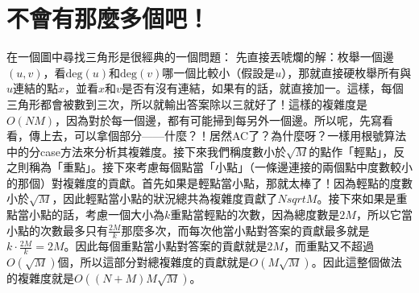 \section{不會有那麼多個吧！}
	在一個圖中尋找三角形是很經典的一個問題：
	先直接丟唬爛的解：枚舉一個邊$(u, v)$，看$\text{deg}(u)$和$\text{deg}(v)$哪一個比較小（假設是$u$），那就直接硬枚舉所有與$u$連結的點$x$，並看$x$和$v$是否有沒有連結，如果有的話，就直接加一。這樣，每個三角形都會被數到三次，所以就輸出答案除以三就好了！這樣的複雜度是$O(NM)$，因為對於每一個邊，都有可能掃到每另外一個邊。所以呢，先寫看看，傳上去，可以拿個部分——什麼？！居然AC了？為什麼呀？一樣用根號算法中的分case方法來分析其複雜度。接下來我們稱度數小於$\sqrt{M}$的點作「輕點」，反之則稱為「重點」。接下來考慮每個點當「小點」（一條邊連接的兩個點中度數較小的那個）對複雜度的貢獻。首先如果是輕點當小點，那就太棒了！因為輕點的度數小於$\sqrt{M}$，因此輕點當小點的狀況總共為複雜度貢獻了$N sqrt{M}$。接下來如果是重點當小點的話，考慮一個大小為$k$重點當輕點的次數，因為總度數是$2M$，所以它當小點的次數最多只有$\frac{2M}{k}$那麼多次，而每次他當小點對答案的貢獻最多就是$k \cdot \frac{2M}{k} = 2M$。因此每個重點當小點對答案的貢獻就是$2M$，而重點又不超過$O(\sqrt{M})$個，所以這部分對總複雜度的貢獻就是$O(M\sqrt{M})$。因此這整個做法的複雜度就是$O((N+M)M\sqrt{M})$。
